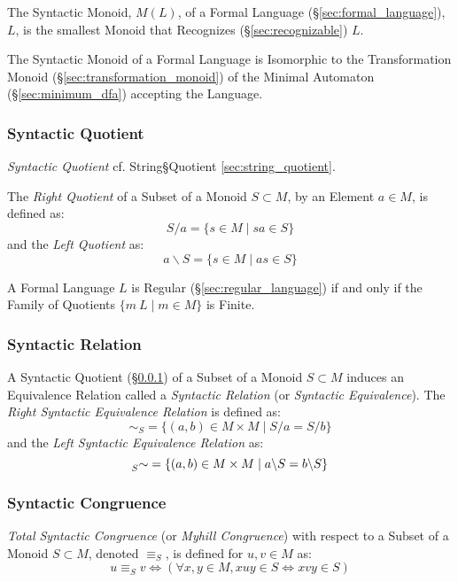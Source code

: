 The Syntactic Monoid, $M(L)$, of a Formal Language
(\S\ref{sec:formal_language}), $L$, is the smallest Monoid that
Recognizes (\S\ref{sec:recognizable}) $L$.

The Syntactic Monoid of a Formal Language is Isomorphic to the
Transformation Monoid (\S\ref{sec:transformation_monoid}) of the
Minimal Automaton (\S\ref{sec:minimum_dfa}) accepting the Language.



\subsubsection{Syntactic Quotient}\label{sec:syntactic_quotient}

\emph{Syntactic Quotient} cf. String\S Quotient
\ref{sec:string_quotient}.

The \emph{Right Quotient} of a Subset of a Monoid $S \subset M$, by an
Element $a \in M$, is defined as:
\[
  S / a = \{ s \in M\;|\;sa \in S \}
\]
and the \emph{Left Quotient} as:
\[
  a \backslash S = \{ s \in M\;|\;as \in S \}
\]

A Formal Language $L$ is Regular (\S\ref{sec:regular_language}) if and
only if the Family of Quotients $\{ m \ L \;|\; m \in M \}$ is Finite.



\subsubsection{Syntactic Relation}\label{sec:syntactic_relation}

A Syntactic Quotient (\S\ref{sec:syntactic_quotient}) of a Subset of a
Monoid $S \subset M$ induces an Equivalence Relation called a
\emph{Syntactic Relation} (or \emph{Syntactic Equivalence}). The
\emph{Right Syntactic Equivalence Relation} is defined as:
\[
  \sim_S = \{ (a,b) \in M \times M \;|\; S/a = S/b\}
\]
and the \emph{Left Syntactic Equivalence Relation} as:
\[
  \prescript{}{S}{\sim} = \{ (a,b) \in M \times M \;|\;
  a \backslash S = b \backslash S \}
\]



\subsubsection{Syntactic Congruence}\label{sec:syntactic_congruence}

\emph{Total Syntactic Congruence} (or \emph{Myhill Congruence}) with
respect to a Subset of a Monoid $S \subset M$, denoted $\equiv_S$, is
defined for $u,v \in M$ as:
\[
  u \equiv_S v \Leftrightarrow
  (\forall x,y \in M, xuy \in S \Leftrightarrow xvy \in S)
\]



